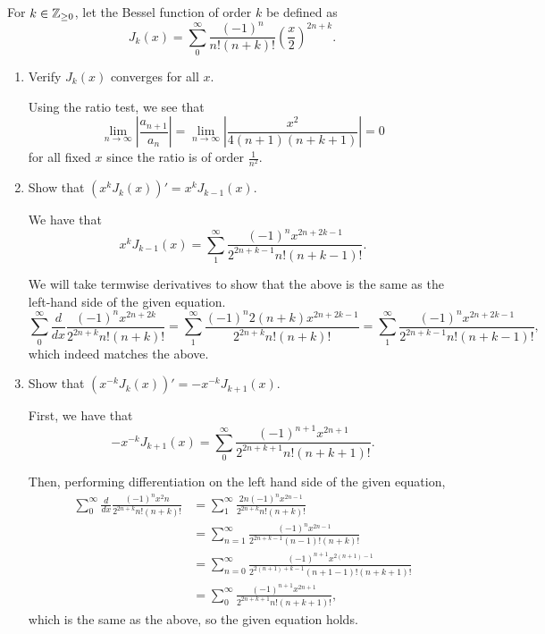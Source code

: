 \documentclass[../hw3]{subfiles}
\begin{document}
\begin{problem}
For $k\in \mathbb{Z}_{\ge 0}$, let the Bessel function of order $k$ be defined as  \[
	J_k(x)=\sum_{0}^{\infty} \frac{(-1)^n}{n!(n+k)!}{\left( \frac{x}{2} \right) }^{2n+k}
	.\]
\begin{enumerate}[label=\alph*)]
	\item Verify $J_k(x)$ converges for all  $x$.

	      Using the ratio test, we see that  \[
		      \lim_{n \to \infty} \left| \frac{a_{n+1}}{a_n} \right| =\lim_{n \to \infty}  \left| \frac{x^2}{4(n+1)(n+k+1)} \right| = 0
	      \] for all fixed $x$ since the ratio is of order  $\frac{1}{n^2}$.
	\item  Show that $(x^k J_k(x))' = x^k J_{k-1}(x)$.

	      We have that \[
		      x^k J_{k-1}(x) = \sum_{1}^{\infty} \frac{(-1)^n x^{2n+2k-1}}{2^{2n+k-1}n!(n+k-1)!}
		      .\]

	      We will take termwise derivatives to show that the above is the same as the left-hand side of the given equation. \[
		      \sum_{0}^{\infty}\frac{d}{dx} \frac{(-1)^n x^{2n+2k}}{2^{2n+k}n!(n+k)!}
		      = \sum_{1}^{\infty} \frac{(-1)^n 2(n+k) x^{2n+2k-1}}{2^{2n+k} n!(n+k)!}
		      = \sum_{1}^{\infty} \frac{(-1)^n x^{2n+2k-1}}{2^{2n+k-1}n!(n+k-1)!}
		      ,\]
	      which indeed matches the above.

	\item Show that $(x^{-k}J_k(x))'=-x^{-k}J_{k+1}(x)$.

	      First, we have that \[
		      -x^{-k}J_{k+1}(x) = \sum_{0}^{\infty} \frac{(-1)^{n+1} x^{2n+1}}{2^{2n+k+1}n!(n+k+1)!}
		      .\]


	      Then, performing differentiation on the left hand side of the given equation,
	      \begin{align*}
		      \sum_{0}^{\infty} \frac{d}{dx} \frac{(-1)^n x^2n}{2^{2n+k}n!(n+k)!} & = \sum_{1}^{\infty} \frac{ 2n (-1)^n x^{2n-1} }{2^{2n+k}n!(n+k)!}                   \\
		                                                                          & = \sum_{n=1}^{\infty} \frac{(-1)^n x^{2n-1}}{2^{2n+k-1}(n-1)!(n+k)!}                \\
		                                                                          & = \sum_{n=0}^{\infty} \frac{(-1)^{n+1}x^{2(n+1)-1}}{2^{2(n+1)+k-1}(n+1-1)!(n+k+1)!} \\
		                                                                          & = \sum_{0}^{\infty} \frac{(-1)^{n+1}x^{2n+1}}{2^{2n+k+1}n!(n+k+1)!}
		      ,\end{align*}
	      which is the same as the above, so the given equation holds.


\end{enumerate}
\end{problem}
\end{document}
